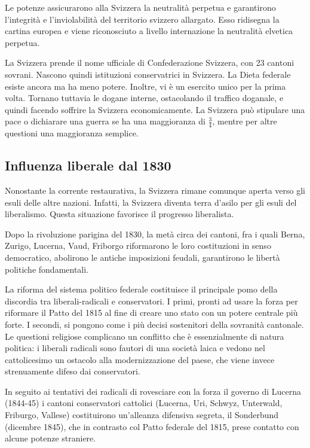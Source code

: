 \documentclass[a4paper]{article}
\begin{document}

Le potenze assicurarono alla Svizzera la neutralità perpetua e garantirono
l'integrità e l'inviolabilità del territorio svizzero allargato.
Esso ridisegna la cartina europea e viene riconosciuto a livello internazione la neutralità elvetica perpetua.

La Svizzera prende il nome ufficiale di Confederazione Svizzera, con 23 cantoni sovrani.
Nascono quindi istituzioni conservatrici in Svizzera.
La Dieta federale esiste ancora ma ha meno potere.
Inoltre, vi è un esercito unico per la prima volta.
Tornano tuttavia le dogane interne, ostacolando il traffico doganale, e quindi facendo
soffrire la Svizzera economicamente.
La Svizzera può stipulare una pace o dichiarare una guerra se ha una maggioranza di \(\frac{3}{4}\),
mentre per altre questioni una maggioranza semplice.

\subsection{Influenza liberale dal 1830}

Nonostante la corrente restaurativa, la Svizzera rimane
comunque aperta verso gli esuli delle altre nazioni.
Infatti, la Svizzera diventa terra d'asilo per gli esuli del liberalismo.
Questa situazione favorisce il progresso liberalista.

Dopo la rivoluzione parigina del 1830, la metà circa dei cantoni, fra i quali Berna, Zurigo,
Lucerna, Vaud, Friborgo riformarono le loro costituzioni in senso democratico,
abolirono le antiche imposizioni feudali, garantirono le libertà politiche fondamentali.

La riforma del sistema politico federale costituisce il principale pomo della discordia
tra liberali-radicali e conservatori. I primi, pronti ad usare la forza per riformare il Patto
del 1815 al fine di creare uno stato con un potere centrale più forte. I secondi, si
pongono come i più decisi sostenitori della sovranità cantonale. Le questioni religiose
complicano un conflitto che è essenzialmente di natura politica: i liberali radicali sono
fautori di una società laica e vedono nel cattolicesimo un ostacolo alla modernizzazione
del paese, che viene invece strenuamente difeso dai conservatori.

In seguito ai tentativi dei radicali di rovesciare con la forza il governo di Lucerna (1844-45)
i cantoni conservatori cattolici (Lucerna, Uri, Schwyz, Unterwald, Friburgo, Vallese)
costituirono un'alleanza difensiva segreta, il Sonderbund (dicembre 1845), che in
contrasto col Patto federale del 1815, prese contatto con alcune potenze straniere.
\end{document}
